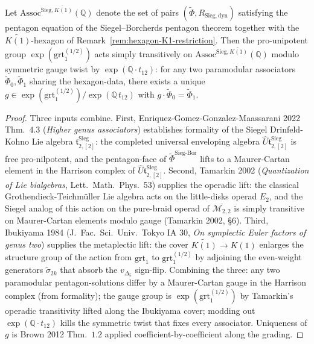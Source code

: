 \begin{theorem}
\label{thm:grt-half-transitivity}
Let $\mathrm{Assoc}^{\mathrm{Sieg},\widetilde{K(1)}}(\mathbb{Q})$ denote the set of
pairs $(\widetilde\Phi, R_{\mathrm{Sieg,dyn}})$ satisfying the pentagon equation
of the Siegel--Borcherds pentagon theorem together with the
$\widetilde{K(1)}$-hexagon of Remark~\ref{rem:hexagon-K1-restriction}. Then the
pro-unipotent group $\exp(\mathrm{grt}_1^{(1/2)})$ acts simply transitively on
$\mathrm{Assoc}^{\mathrm{Sieg},\widetilde{K(1)}}(\mathbb{Q})$ modulo symmetric
gauge twist by $\exp(\mathbb{Q}\cdot t_{12})$: for any two paramodular associators
$\widetilde\Phi_0,\widetilde\Phi_1$ sharing the hexagon-data, there exists a unique
$g\in \exp(\mathrm{grt}_1^{(1/2)})/\exp(\mathbb{Q}\,t_{12})$ with
$g\cdot\widetilde\Phi_0 = \widetilde\Phi_1$.
\end{theorem}

\begin{proof}
Three inputs combine. First, Enriquez-Gomez-Gonzalez-Maassarani 2022 Thm.~$4.3$
(\emph{Higher genus associators}) establishes formality of the Siegel
Drinfeld-Kohno Lie algebra $\mathfrak{t}^{\mathrm{Sieg}}_{2,[2]}$: the completed
universal enveloping algebra $\widehat{U}\mathfrak{t}^{\mathrm{Sieg}}_{2,[2]}$ is
free pro-nilpotent, and the pentagon-face of $\widetilde\Phi^{\mathrm{Sieg\text{-}Bor}}$
lifts to a Maurer-Cartan element in the Harrison complex of
$\widehat{U}\mathfrak{t}^{\mathrm{Sieg}}_{2,[2]}$. Second, Tamarkin 2002
(\emph{Quantization of Lie bialgebras}, Lett.\ Math.\ Phys.\ 53) supplies the
operadic lift: the classical Grothendieck-Teichm\"uller Lie algebra acts on the
little-disks operad $E_2$, and the Siegel analog of this action on the pure-braid
operad of $\overline{\mathcal{M}_{2,2}}$ is simply transitive on Maurer-Cartan
elements modulo gauge (Tamarkin 2002, \S $6$). Third, Ibukiyama 1984 (J.\ Fac.\
Sci.\ Univ.\ Tokyo IA $30$, \emph{On symplectic Euler factors of genus two})
supplies the metaplectic lift: the cover $\widetilde{K(1)}\to K(1)$ enlarges the
structure group of the action from $\mathrm{grt}_1$ to $\mathrm{grt}_1^{(1/2)}$
by adjoining the even-weight generators $\widetilde\sigma_{2k}$ that absorb the
$v_{\Delta_5}$ sign-flip. Combining the three: any two paramodular pentagon-solutions
differ by a Maurer-Cartan gauge in the Harrison complex (from formality); the gauge
group is $\exp(\mathrm{grt}_1^{(1/2)})$ by Tamarkin's operadic transitivity lifted
along the Ibukiyama cover; modding out $\exp(\mathbb{Q}\cdot t_{12})$ kills the
symmetric twist that fixes every associator. Uniqueness of $g$ is Brown 2012
Thm.~$1.2$ applied coefficient-by-coefficient along the grading.
\end{proof}


